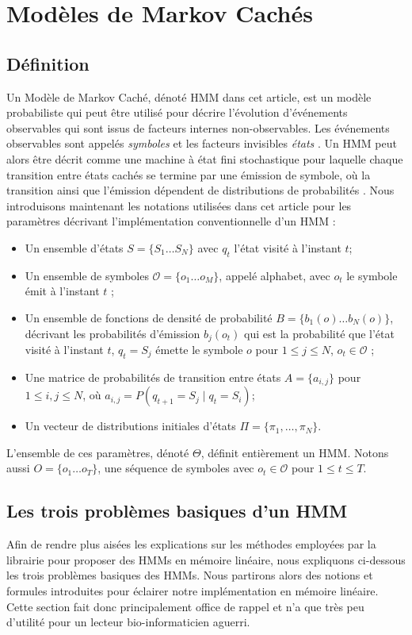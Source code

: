 \documentclass[letterpaper]{article}
\begin{document}
\section{Modèles de Markov Cachés}
\subsection{Définition}
Un Modèle de Markov Caché, dénoté HMM dans cet article, est un modèle probabiliste qui peut être utilisé pour décrire l'évolution d'événements observables qui sont issus de facteurs internes non-observables. Les événements observables sont appelés \textit{symboles} et les facteurs invisibles \textit{états} \citep{Intro}. Un HMM peut alors être décrit comme une machine à état fini stochastique pour laquelle chaque transition entre états cachés se termine par une émission de symbole, où la transition ainsi que l'émission dépendent de distributions de probabilités \citep{Ch}. Nous introduisons maintenant les notations utilisées dans cet article pour les paramètres décrivant l'implémentation conventionnelle d'un HMM \citep{Ch} : 
\begin{itemize}
	\item Un ensemble d'états $S=\{S_1\dots S_N\}$ avec $q_t$ l'état visité à l'instant $t$;
	\item Un ensemble de symboles $\mathcal{O} = \{o_1\dots o_M\}$, appelé alphabet, avec $o_t$ le symbole émit à l'instant $t$ ;
	\item Un ensemble de fonctions de densité de probabilité $B = \{b_1(o) \dots b_N(o)\}$, décrivant les probabilités d'émission $b_j(o_t)$ qui est la probabilité que l'état visité à l'instant $t$, $q_t = S_j$ émette le symbole $o$ pour $1\leq j\leq N$, $o_t \in \mathcal{O} $ ; 
	\item Une matrice de probabilités de transition entre états $A = \{a_{i, j}\}$ pour $1\leq i, j \leq N$, où $a_{i, j}=P(q_{t+1} = S_j \mid q_t = S_i)$;
	\item Un vecteur de distributions initiales d'états $\Pi = \{\pi_1,\dots ,\pi_N\}$.
\end{itemize}
L'ensemble de ces paramètres, dénoté $\Theta$, définit entièrement un HMM. Notons aussi $O=\{o_1 \dots o_T\}$, une séquence de symboles avec $o_t \in \mathcal{O}$ pour $1 \leq t \leq T$. 

\subsection{Les trois problèmes basiques d'un HMM}
Afin de rendre plus aisées les explications sur les méthodes employées par la librairie pour proposer des HMMs en mémoire linéaire, nous expliquons ci-dessous les trois problèmes basiques des HMMs. Nous partirons alors des notions et formules introduites pour éclairer notre implémentation en mémoire linéaire. Cette section fait donc principalement office de rappel et n'a que très peu d'utilité pour un lecteur bio-informaticien aguerri.
\end{document}

